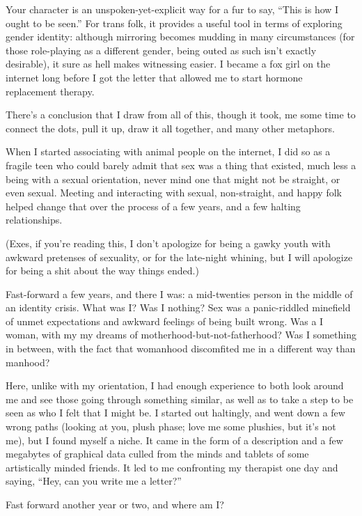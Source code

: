 Your character is an unspoken-yet-explicit way for a fur to say, ``This is how I ought to be seen.''  For trans folk, it provides a useful tool in terms of exploring gender identity: although mirroring becomes mudding in many circumstances (for those role-playing as a different gender, being outed as such isn't exactly desirable), it sure as hell makes witnessing easier.  I became a fox girl on the internet long before I got the letter that allowed me to start hormone replacement therapy.

There's a conclusion that I draw from all of this, though it took, me some time to connect the dots, pull it up, draw it all together, and many other metaphors.

When I started associating with animal people on the internet, I did so as a fragile teen who could barely admit that sex was a thing that existed, much less a being with a sexual orientation, never mind one that might not be straight, or even sexual.  Meeting and interacting with sexual, non-straight, and happy folk helped change that over the process of a few years, and a few halting relationships.

(Exes, if you're reading this, I don't apologize for being a gawky youth with awkward pretenses of sexuality, or for the late-night whining, but I will apologize for being a shit about the way things ended.)

Fast-forward a few years, and there I was: a mid-twenties person in the middle of an identity crisis.  What was I?  Was I nothing?  Sex was a panic-riddled minefield of unmet expectations and awkward feelings of being built wrong.  Was a I woman, with my my dreams of motherhood-but-not-fatherhood?  Was I something in between, with the fact that womanhood discomfited me in a different way than manhood?

Here, unlike with my orientation, I had enough experience to both look around me and see those going through something similar, as well as to take a step to be seen as who I felt that I might be.  I started out haltingly, and went down a few wrong paths (looking at you, plush phase; love me some plushies, but it's not me), but I found myself a niche.  It came in the form of a description and a few megabytes of graphical data culled from the minds and tablets of some artistically minded friends.  It led to me confronting my therapist one day and saying, ``Hey, can you write me a letter?''

Fast forward another year or two, and where am I?

